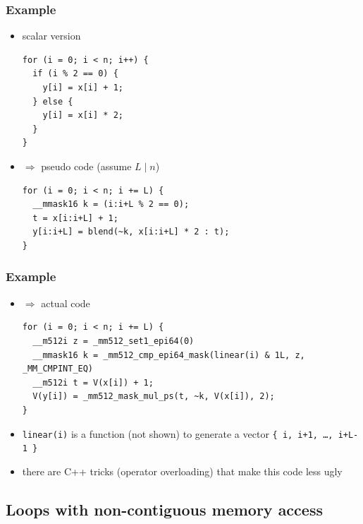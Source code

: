 \documentclass[12pt,dvipdfmx]{beamer}
\begin{document}
\begin{frame}[fragile]
  \frametitle{Example}
  \begin{itemize}
  \item scalar version
\begin{lstlisting}
for (i = 0; i < n; i++) {
  if (i % 2 == 0) {  
    y[i] = x[i] + 1;
  } else {
    y[i] = x[i] * 2;
  }
}
\end{lstlisting}
\item $\Rightarrow$ pseudo code (assume $L\;|\;n$)
\begin{lstlisting}
for (i = 0; i < n; i += L) {
  __mmask16 k = (i:i+L % 2 == 0);
  t = x[i:i+L] + 1;
  y[i:i+L] = blend(~k, x[i:i+L] * 2 : t);
}
\end{lstlisting}
\end{itemize}
\end{frame}


\begin{frame}[fragile]
  \frametitle{Example}
  \begin{itemize}
\item $\Rightarrow$ actual code

\begin{lstlisting}
for (i = 0; i < n; i += L) {
  __m512i z = _mm512_set1_epi64(0)
  __mmask16 k = _mm512_cmp_epi64_mask(linear(i) & 1L, z, _MM_CMPINT_EQ)
  __m512i t = V(x[i]) + 1;
  V(y[i]) = _mm512_mask_mul_ps(t, ~k, V(x[i]), 2);
}
\end{lstlisting}

\item {\tt linear(i)} is a function (not shown) to generate a vector
  {\tt \{ i, i+1, \ldots , i+L-1 \}}

\item there are C++ tricks (operator overloading) that make this code less ugly

\end{itemize}

\end{frame}

\subsection{Loops with non-contiguous memory access}
\end{document}
